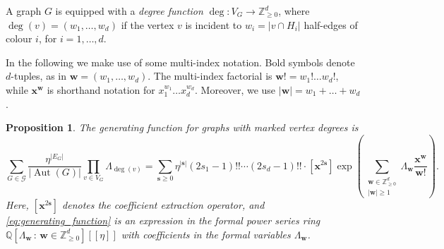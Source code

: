 \documentclass[11pt, a4paper]{article}
\numberwithin{theorem}{section}
\newtheorem{proposition}[theorem]{Proposition}
\theoremstyle{remark}
\newcommand{\GG}{\mathcal{G}}
\newcommand{\QQ}{\mathbb{Q}}
\newcommand{\ZZ}{\mathbb{Z}}
\DeclareMathOperator{\Aut}{Aut}
\newcommand{\bb}[1]{\boldsymbol{#1}}
\theoremstyle{theorem}
\begin{document}
A graph $G$ is equipped with a \emph{degree function} $\deg\colon V_G \rightarrow \ZZ^d_{\geq 0}$, where $\deg(v) = (w_1,\dots,w_d)$ if the vertex $v$ is incident to $w_i = |v\cap H_i|$ half-edges of colour $i$, for $i=1,\dots,d$. \par   
In the following we make use of some multi-index notation. Bold symbols denote $d$-tuples, as in $\bb{w} = (w_1,\dots,w_d)$. The multi-index factorial is $\bb{w}! = w_1!\dots w_d!$, while $\bb{x}^{\bb{w}}$ is shorthand notation for $x_1^{w_1} \dots x_d^{w_d}$. Moreover, we use $|\bb{w}| = w_1+\dots +w_d$.

\begin{proposition}
  \label{prop:gf_graphs}
  The generating function for graphs with marked vertex degrees is 
  \begin{equation}
    \label{eq:generating_function}
    \sum_{G \in \GG} \frac{\eta^{|E_G|}}{|\Aut(G)|}\prod_{v\in V_G} \Lambda_{\deg(v)} =  \sum_{\bb{s} \geq 0} \eta^{|\bb{s}|} (2s_1-1)!!\cdots (2s_d-1)!!\cdot [\bb{x}^{2\bb{s}}]\exp\left( \sum_{\substack{\bb{w}\in \ZZ^d_{\geq 0}\\ |\bb{w}| \geq 1}} \Lambda_{\bb{w}} \frac{\bb{x}^{\bb{w}}}{\bb{w}!} \right).
  \end{equation}
  Here, $[\bb{x}^{2\bb{s}}]$ denotes the coefficient extraction operator, and \eqref{eq:generating_function} is an expression in the formal power series ring $\QQ[\Lambda_{\bb{w}} \,:\, \bb{w}\in\ZZ^d_{\geq 0}][[\eta]]$ with coefficients in the formal variables $\Lambda_{\bb{w}}$.
\end{proposition}
\end{document}

